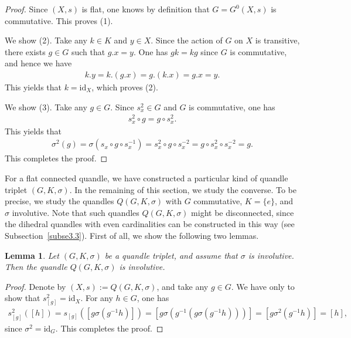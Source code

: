 \documentclass[12pt]{amsart}
\newtheorem{Lem}[Prop]{Lemma}
\theoremstyle{definition}
\begin{document}
\begin{proof}
Since $ (X,s) $ is flat, one knows by definition that $ G = G^{0}(X,s) $ is commutative. This proves (1).

We show (2). Take any $ k \in K $ and $ y \in X $. Since the action of $ G $ on $ X $ is transitive, there exists $ g \in G $ such that $ g.x = y $. One has $ gk=kg $ since $ G $ is commutative, and hence we have
\begin{align*}
k.y = k.(g.x) = g.(k.x) = g.x = y.
\end{align*}
This yields that $ k = {\mathrm{id}}_{X} $, which proves (2).

We show (3). Take any $ g \in G $. Since $ s^{2}_{x} \in G $ and $ G $ is commutative, one has
\begin{align*}
s^{2}_{x} \circ g = g \circ s^{2}_{x}.
\end{align*}
This yields that
\begin{align*}
\sigma^{2}(g) = \sigma(s_{x} \circ g \circ s^{-1}_{x}) = s^{2}_{x} \circ g \circ s^{-2}_{x} = g \circ s^{2}_{x} \circ s^{-2}_{x} = g.
\end{align*}
This completes the proof.
\end{proof}

For a flat connected quandle, we have constructed a particular kind of quandle triplet $ (G,K,\sigma) $. In the remaining of this section, we study the converse. To be precise, we study the quandles $ Q(G,K,\sigma) $ with $ G $ commutative, $ K = \{ e \} $, and $ \sigma $ involutive. Note that such quandles $ Q(G,K,\sigma) $ might be disconnected, since the dihedral quandles with even cardinalities can be constructed in this way (see Subsection~\ref{subse3.3}). First of all, we show the following two lemmas.

\begin{Lem}\label{Lem5.3}
Let $ (G,K,\sigma) $ be a quandle triplet, and assume that $ \sigma $ is involutive. Then the quandle $ Q(G,K,\sigma) $ is involutive.
\end{Lem}

\begin{proof}
Denote by $ (X,s) := Q(G,K,\sigma) $, and take any $ g \in G $. We have only to show that $ s_{[g]}^{2} = {\mathrm{id}}_{X} $. For any $ h \in G $, one has
\begin{align*}
s_{[g]}^{2}([h]) = s_{[g]}([g \sigma(g^{-1}h)]) = [g\sigma(g^{-1}(g\sigma(g^{-1}h)))] = [g\sigma^{2}(g^{-1}h)] = [h],
\end{align*}
since $ \sigma^{2} = {\mathrm{id}}_{G} $. This completes the proof.
\end{proof}
\end{document}

